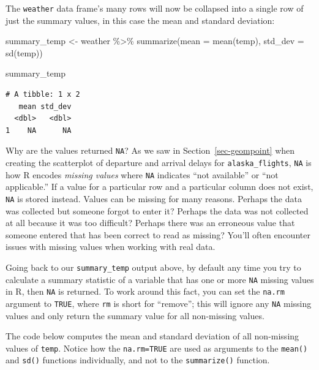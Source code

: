 \documentclass[
  letterpaper,
  DIV=11,
  numbers=noendperiod]{scrreprt}
\newenvironment{Shaded}{\begin{snugshade}}{\end{snugshade}}
\newcommand{\AttributeTok}[1]{\textcolor[rgb]{0.40,0.45,0.13}{#1}}
\newcommand{\FunctionTok}[1]{\textcolor[rgb]{0.28,0.35,0.67}{#1}}
\newcommand{\NormalTok}[1]{\textcolor[rgb]{0.00,0.23,0.31}{#1}}
\newcommand{\OtherTok}[1]{\textcolor[rgb]{0.00,0.23,0.31}{#1}}
\newcommand{\SpecialCharTok}[1]{\textcolor[rgb]{0.37,0.37,0.37}{#1}}
\theoremstyle{definition}
\theoremstyle{remark}
\begin{document}
The \texttt{weather} data frame's many rows will now be collapsed into a
single row of just the summary values, in this case the mean and
standard deviation:

\begin{Shaded}
\begin{Highlighting}[]
\NormalTok{summary\_temp }\OtherTok{\textless{}{-}}\NormalTok{ weather }\SpecialCharTok{\%\textgreater{}\%} 
  \FunctionTok{summarize}\NormalTok{(}\AttributeTok{mean =} \FunctionTok{mean}\NormalTok{(temp), }\AttributeTok{std\_dev =} \FunctionTok{sd}\NormalTok{(temp))}

\NormalTok{summary\_temp}
\end{Highlighting}
\end{Shaded}

\begin{verbatim}
# A tibble: 1 x 2
   mean std_dev
  <dbl>   <dbl>
1    NA      NA
\end{verbatim}

Why are the values returned \texttt{NA}? As we saw in
Section~\ref{sec-geompoint} when creating the scatterplot of departure
and arrival delays for \texttt{alaska\_flights}, \texttt{NA} is how R
encodes \emph{missing values} where \texttt{NA} indicates ``not
available'' or ``not applicable.'' If a value for a particular row and a
particular column does not exist, \texttt{NA} is stored instead. Values
can be missing for many reasons. Perhaps the data was collected but
someone forgot to enter it? Perhaps the data was not collected at all
because it was too difficult? Perhaps there was an erroneous value that
someone entered that has been correct to read as missing? You'll often
encounter issues with missing values when working with real data.

Going back to our \texttt{summary\_temp} output above, by default any
time you try to calculate a summary statistic of a variable that has one
or more \texttt{NA} missing values in R, then \texttt{NA} is returned.
To work around this fact, you can set the \texttt{na.rm} argument to
\texttt{TRUE}, where \texttt{rm} is short for ``remove''; this will
ignore any \texttt{NA} missing values and only return the summary value
for all non-missing values.

The code below computes the mean and standard deviation of all
non-missing values of \texttt{temp}. Notice how the \texttt{na.rm=TRUE}
are used as arguments to the \texttt{mean()} and \texttt{sd()} functions
individually, and not to the \texttt{summarize()} function.
\end{document}
